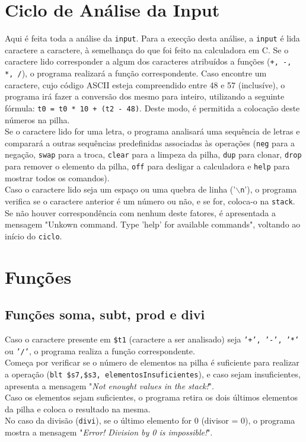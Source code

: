 \documentclass[12pt, a4paper]{article}
\begin{document}
    \section{Ciclo de Análise da Input}
    Aqui é feita toda a análise da \texttt{input}. Para a execção desta análise, a \texttt{input} é lida caractere a caractere, à semelhança do que foi feito na calculadora em C. Se o caractere lido corresponder a algum dos caracteres atribuídos a funções (\texttt{+, -, *, /}), o programa realizará a função correspondente. Caso encontre um caractere, cujo código ASCII esteja compreendido entre 48 e 57 (inclusíve), o programa irá fazer a conversão dos mesmo para inteiro, utilizando a seguinte fórmula: \texttt{t0 = t0 * 10 + (t2 - 48)}. Deste modo, é permitida a colocação deste números na pilha.\\
    Se o caractere lido for uma letra, o programa analisará uma sequência de letras e comparará a outras sequências predefinidas associadas às operações (\texttt{neg} para a negação, \texttt{swap} para a troca, \texttt{clear} para a limpeza da pilha, \texttt{dup} para clonar, \texttt{drop} para remover o elemento da pilha, \texttt{off} para desligar a calculadora e \texttt{help} para mostrar todos os comandos).\\
    Caso o caractere lido seja um espaço ou uma quebra de linha ('\texttt{$\backslash$n}'), o programa verifica se o caractere anterior é um número ou não, e se for, coloca-o na \texttt{stack}.\\
    Se não houver correspondência com nenhum deste fatores, é apresentada a mensagem "Unkown command. Type 'help' for available commands", voltando ao início do \texttt{ciclo}.
    
    \section{Funções}
    
        \subsection{Funções soma, subt, prod e divi}
        Caso o caractere presente em \texttt{\$t1} (caractere a ser analisado) seja \texttt{'+', '-', '*'} ou \texttt{'/'}, o programa realiza a função correspondente.\\
        Começa por verificar se o número de elementos na pilha é suficiente para realizar a operação (\texttt{blt \$s7,\$s3, elementosInsuficientes}), e caso sejam insuficientes, apresenta a mensagem "\textit{Not enought values in the stack!}".\\
        Caso os elementos sejam suficientes, o programa retira os dois últimos elementos da pilha e coloca o resultado na mesma.\\
        No caso da divisão (\texttt{divi}), se o último elemento for 0 (divisor = 0), o programa mostra a mensagem "\textit{Error! Division by 0 is impossible!}".
        
\end{document}
